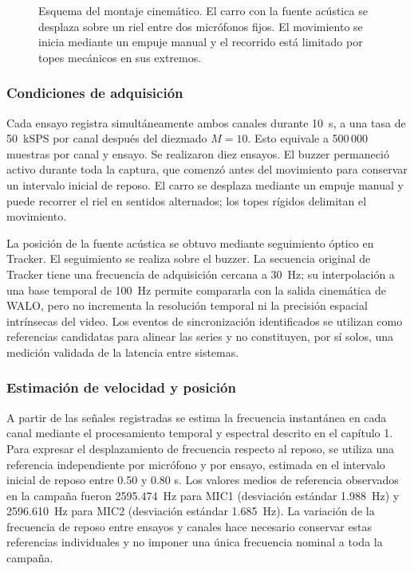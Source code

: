 \begin{figure}[!htbp]
    \centering
    
    \caption{Esquema del montaje cinemático.
    El carro con la fuente acústica se desplaza sobre
    un riel entre dos micrófonos fijos. El movimiento
    se inicia mediante un empuje manual y el recorrido
    está limitado por topes mecánicos en sus extremos.}
    \label{fig:montaje_exp03}
\end{figure}

\subsubsection{Condiciones de adquisición}

Cada ensayo registra simultáneamente ambos canales
durante \SI{10}{\second}, a una tasa de
\SI{50}{kSPS} por canal después del diezmado
$M=10$. Esto equivale a 500\,000 muestras por
canal y ensayo. Se realizaron diez ensayos. El
buzzer permaneció activo durante toda la captura,
que comenzó antes del movimiento para conservar
un intervalo inicial de reposo. El carro se desplaza
mediante un empuje manual y puede recorrer el riel
en sentidos alternados; los topes rígidos delimitan
el movimiento.

La posición de la fuente acústica se obtuvo mediante
seguimiento óptico en Tracker. El seguimiento se
realiza sobre el buzzer. La secuencia original de
Tracker tiene una frecuencia de adquisición cercana
a \SI{30}{\hertz}; su interpolación a una base
temporal de \SI{100}{\hertz} permite compararla
con la salida cinemática de WALO, pero no incrementa
la resolución temporal ni la precisión espacial
intrínsecas del video. Los eventos de sincronización
identificados se utilizan como referencias candidatas
para alinear las series y no constituyen, por sí
solos, una medición validada de la latencia entre
sistemas.

\subsubsection{Estimación de velocidad y posición}

A partir de las señales registradas se estima
la frecuencia instantánea en cada canal mediante
el procesamiento temporal y espectral descrito
en el capítulo 1. Para expresar el desplazamiento
de frecuencia respecto al reposo, se utiliza una
referencia independiente por micrófono y por ensayo,
estimada en el intervalo inicial de reposo entre
0.50 y 0.80 s. Los valores medios de referencia
observados en la campaña fueron
\SI{2595.474}{\hertz} para MIC1
(desviación estándar \SI{1.988}{\hertz}) y
\SI{2596.610}{\hertz} para MIC2
(desviación estándar \SI{1.685}{\hertz}).
La variación de la frecuencia de reposo entre
ensayos y canales hace necesario conservar estas
referencias individuales y no imponer una única
frecuencia nominal a toda la campaña.

